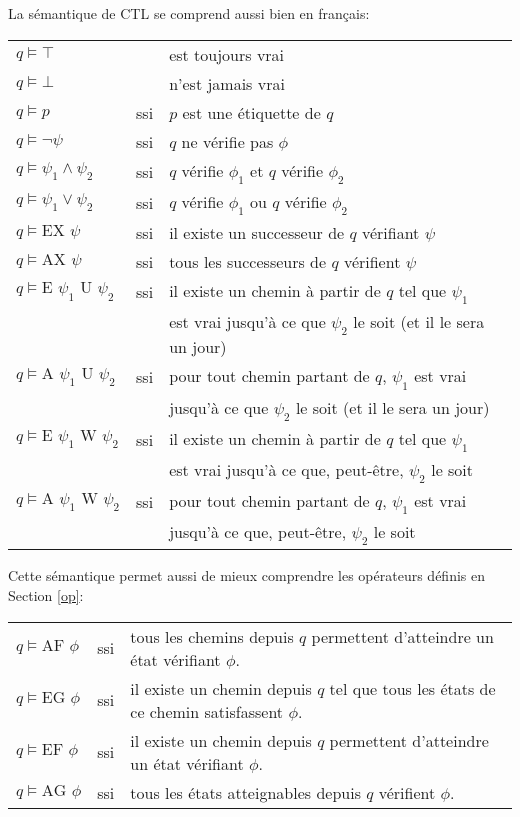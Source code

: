 \documentclass[10pt,a4paper]{article}
\begin{document}
\bigskip

La sémantique de CTL se comprend aussi bien en français:

\begin{tabular}{lcl}
$q \vDash \top$ && est toujours vrai\\
$q \vDash \bot$ && n'est jamais vrai\\
$q \vDash p$ &ssi& $p$ est une étiquette de $q$\\
$q \vDash \neg \psi$ &ssi& $q$ ne vérifie pas $\phi$\\
$q \vDash \psi_1 \land \psi_2$ &ssi& $q$ vérifie $\phi_1$ et $q$ vérifie $\phi_2$\\
$q \vDash \psi_1 \lor \psi_2$ &ssi& $q$ vérifie $\phi_1$ ou $q$ vérifie $\phi_2$\\
$q \vDash \mbox{EX } \psi$ &ssi& il existe un successeur de $q$ vérifiant $\psi$\\
$q \vDash \mbox{AX } \psi$ &ssi& tous les successeurs de $q$ vérifient $\psi$\\
$q \vDash \mbox{E } \psi_1 \mbox{ U } \psi_2$ &ssi& il existe un chemin à partir de $q$ tel que $\psi_1$\\&& est vrai jusqu'à ce que $\psi_2$ le soit (et il le sera un jour)\\

$q \vDash \mbox{A } \psi_1 \mbox{ U } \psi_2$ &ssi& pour tout chemin partant de $q$, $\psi_1$ est vrai \\&& jusqu'à ce que $\psi_2$ le soit (et il le sera un jour)\\

$q \vDash \mbox{E } \psi_1 \mbox{ W } \psi_2$ &ssi& il existe un chemin à partir de $q$ tel que $\psi_1$\\&& est vrai jusqu'à ce que, peut-être, $\psi_2$ le soit\\

$q \vDash \mbox{A } \psi_1 \mbox{ W } \psi_2$ &ssi& pour tout chemin partant de $q$, $\psi_1$ est vrai \\&& jusqu'à ce que, peut-être, $\psi_2$ le soit\\
\end{tabular}

Cette sémantique permet aussi de mieux comprendre les opérateurs définis en Section \ref{op}:

\begin{tabular}{lcl}
$q \vDash \mbox{AF } \phi$ & ssi & tous les chemins depuis $q$ permettent d'atteindre un état vérifiant $\phi$. \\
$q \vDash \mbox{EG } \phi$ & ssi & il existe un chemin depuis $q$ tel que tous les états de ce chemin satisfassent $\phi$.\\
$q \vDash \mbox{EF } \phi$ & ssi & il existe un chemin depuis $q$ permettent d'atteindre un état vérifiant $\phi$. \\
$q \vDash \mbox{AG } \phi$ & ssi & tous les états atteignables depuis $q$ vérifient $\phi$.\\
\end{tabular}
\end{document}
